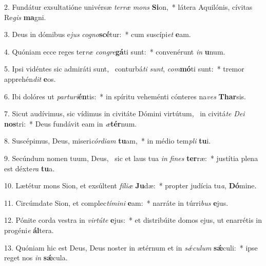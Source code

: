 2. Fundátur exsultatióne univérsæ \textit{ter}\textit{ræ} \textit{mons} \textbf{Si}on,~*  látera Aquilónis, cívitas Re\textit{gis} \textbf{ma}gni.\

3. Deus in dómibus e\textit{jus} \textit{co}\textit{gno}\textbf{scé}tur:~*  cum suscípi\textit{et} \textbf{e}am.\

4. Quóniam ecce reges ter\textit{ræ} \textit{con}\textit{gre}\textbf{gá}ti sunt:~*  convenérunt \textit{in} \textbf{u}num.\

5. Ipsi vidéntes sic admiráti sunt, \dag\  conturbá\textit{ti} \textit{sunt}, \textit{com}\textbf{mó}ti sunt:~*  tremor apprehén\textit{dit} \textbf{e}os.\

6. Ibi dolóres ut \textit{par}\textit{tu}\textit{ri}\textbf{én}tis:~*  in spíritu veheménti cónteres na\textit{ves} \textbf{Thar}sis.\

7. Sicut audívimus, sic vídimus in civitáte Dómini virtútum, \dag\  in civitá\textit{te} \textit{De}\textit{i} \textbf{nos}tri:~*  Deus fundávit eam in \textit{æ}\textbf{tér}num.\

8. Suscépimus, Deus, miseri\textit{cór}\textit{di}\textit{am} \textbf{tu}am,~*  in médio tem\textit{pli} \textbf{tu}i.\

9. Secúndum nomen tuum, Deus, \dag\  sic et laus tua \textit{in} \textit{fi}\textit{nes} \textbf{ter}ræ:~*  justítia plena est déxte\textit{ra} \textbf{tu}a.\

10. Lætétur mons Sion, et exsúltent \textit{fí}\textit{li}\textit{æ} \textbf{Ju}dæ:~*  propter judícia tu\textit{a}, \textbf{Dó}mine.\

11. Circúmdate Sion, et complec\textit{tí}\textit{mi}\textit{ni} \textbf{e}am:~*  narráte in túrri\textit{bus} \textbf{e}jus.\

12. Pónite corda vestra in \textit{vir}\textit{tú}\textit{te} \textbf{e}jus:~*  et distribúite domos ejus, ut enarrétis in progéni\textit{e} \textbf{ál}tera.\

13. Quóniam hic est Deus, Deus noster in ætérnum et in \textit{sǽ}\textit{cu}\textit{lum} \textbf{sǽ}culi:~*  ipse reget nos \textit{in} \textbf{sǽ}cula.\

